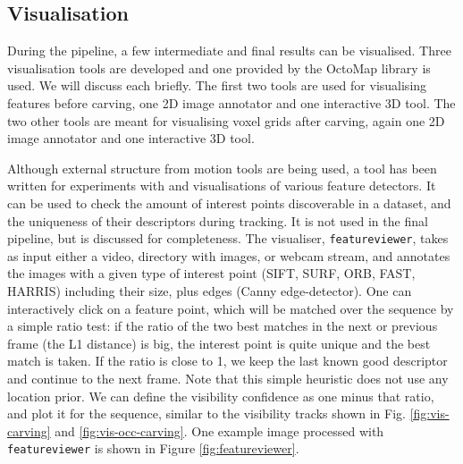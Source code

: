 \subsection{Visualisation}
During the pipeline, a few intermediate and final results can be visualised. Three visualisation tools are developed and one provided by the OctoMap library is used. We will discuss each briefly. The first two tools are used for visualising features before carving, one 2D image annotator and one interactive 3D tool. The two other tools are meant for visualising voxel grids after carving, again one 2D image annotator and one interactive 3D tool.

Although external structure from motion tools are being used, a tool has been written for experiments with and visualisations of various feature detectors. It can be used to check the amount of interest points discoverable in a dataset, and the uniqueness of their descriptors during tracking. It is not used in the final pipeline, but is discussed for completeness. The visualiser, \texttt{featureviewer}, takes as input either a video, directory with images, or webcam stream, and annotates the images with a given type of interest point (\eg SIFT, SURF, ORB, FAST, HARRIS) including their size, plus edges (Canny edge-detector). One can interactively click on a feature point, which will be matched over the sequence by a simple ratio test: if the ratio of the two best matches in the next or previous frame (\ie the L1 distance) is big, the interest point is quite unique and the best match is taken. If the ratio is close to 1, we keep the last known good descriptor and continue to the next frame. Note that this simple heuristic does not use any location prior. We can define the visibility confidence as one minus that ratio, and plot it for the sequence, similar to the visibility tracks shown in Fig. \ref{fig:vis-carving} and \ref{fig:vis-occ-carving}. One example image processed with \texttt{featureviewer} is shown in Figure \ref{fig:featureviewer}.

